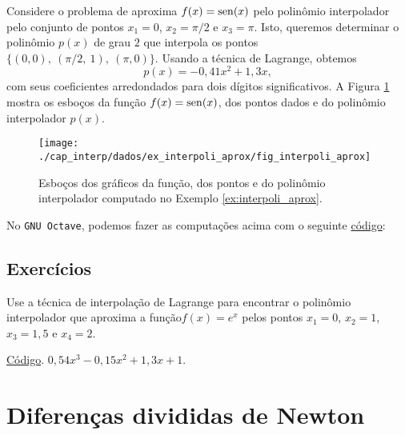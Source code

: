 \begin{ex}\label{ex:interpoli_aprox}
  Considere o problema de aproxima $f(x) = \operatorname{sen}(x)$ pelo polinômio interpolador pelo conjunto de pontos $x_1=0$, $x_2=\pi/2$ e $x_3=\pi$. Isto, queremos determinar o polinômio $p(x)$ de grau $2$ que interpola os pontos $\{(0,0),~(\pi/2,~1),~(\pi,0)\}$. Usando a técnica de Lagrange, obtemos
  \begin{equation}
    p(x) = -0,41x^2 + 1,3x,
  \end{equation}
com seus coeficientes arredondados para dois dígitos significativos. A Figura \ref{fig:interpoli_aprox} mostra os esboços da função $f(x)=\operatorname{sen}(x)$, dos pontos dados e do polinômio interpolador $p(x)$.

\begin{figure}[h!]
  \centering
  \texttt{[image: ./cap\_interp/dados/ex\_interpoli\_aprox/fig\_interpoli\_aprox]}
  \caption{Esboços dos gráficos da função, dos pontos e do polinômio interpolador computado no Exemplo \ref{ex:interpoli_aprox}.}
  \label{fig:interpoli_aprox}
\end{figure}

\ifisoctave
No \verb+GNU Octave+, podemos fazer as computações acima com o seguinte \href{https://github.com/phkonzen/notas/blob/master/src/MatematicaNumerica/cap_interp/dados/ex_interpoli_aprox/ex_interpoli_aprox.m}{código}:

\fi
\end{ex}

\subsection*{Exercícios}

\begin{exer}
  Use a técnica de interpolação de Lagrange para encontrar o polinômio interpolador que aproxima a função$f(x)=e^{x}$ pelos pontos $x_1=0$, $x_2=1$, $x_3=1,5$ e $x_4=2$.
\end{exer}
\begin{resp}
\ifisoctave
\href{https://github.com/phkonzen/notas/blob/master/src/MatematicaNumerica/cap_interp/dados/exer_interpoli_aprox1/exer_interpoli_aprox1.m}{Código}.
\fi
$0,54x^3 - 0,15x^2 + 1,3x + 1$.
\end{resp}

\emconstrucao

\section{Diferenças divididas de Newton}\label{cap_interp_difdiv}

